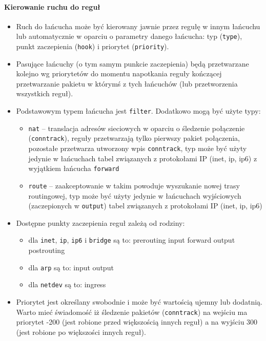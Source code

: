 \paragraph{Kierowanie ruchu do reguł}
\begin{itemize}
	\item Ruch do łańcucha może być kierowany jawnie przez regułę w innym łańcuchu lub automatycznie w oparciu o parametry danego łańcucha: typ (\Verb#type#), punkt zaczepienia (\Verb#hook#) i priorytet (\Verb#priority#).
	\item Pasujące łańcuchy (o tym samym punkcie zaczepienia) będą przetwarzane kolejno wg priorytetów do momentu napotkania reguły kończącej przetwarzanie pakietu w którymś z tych łańcuchów (lub przetworzenia wszystkich reguł).
	\item Podstawowym typem łańcucha jest \Verb#filter#. Dodatkowo mogą być użyte typy:
	\begin{itemize}
		\item \Verb#nat# –
			translacja adresów sieciowych w oparciu o śledzenie połączenie (\Verb#conntrack#),
			reguły przetwarzają tylko pierwszy pakiet połączenia, pozostałe przetwarza utworzony wpis \Verb#conntrack#,
			typ może być użyty jedynie w łańcuchach tabel związanych z protokołami IP (inet, ip, ip6) z wyjątkiem łańcucha \Verb#forward#
		\item \Verb#route# –
			zaakceptowanie w takim powoduje wyszukanie nowej trasy routingowej,
			typ może być użyty jedynie w łańcuchach wyjściowych (zaczepionych w \Verb#output#) tabel związanych z protokołami IP (inet, ip, ip6)
	\end{itemize}
	\item Dostępne punkty zaczepienia reguł zależą od rodziny:
	\begin{itemize}
		\item dla \Verb#inet#, \Verb#ip#, \Verb#ip6# i \Verb#bridge# są to:
			prerouting
			input
			forward
			output
			postrouting
		\item dla \Verb#arp# są to:
			input
			output
		\item dla \Verb#netdev# są to:
			ingress
	\end{itemize}
	\item Priorytet jest określany swobodnie i może być wartością ujemny lub dodatnią.
		Warto mieć świadomość iż śledzenie pakietów (\Verb#conntrack#) na wejściu ma priorytet -200 (jest robione przed większością innych reguł) a na wyjściu 300 (jest robione po większości innych reguł).
\end{itemize}

